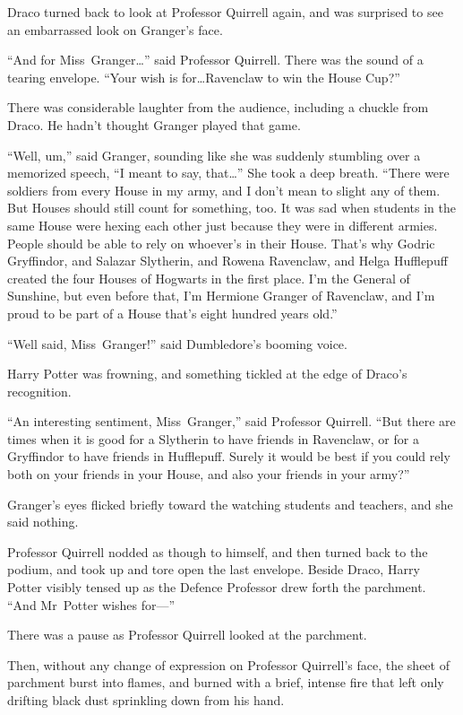 Draco turned back to look at Professor Quirrell again, and was surprised to see
an embarrassed look on Granger’s face.

“And for Miss~Granger…” said Professor Quirrell. There was the sound of
a tearing envelope. “Your wish is for…Ravenclaw to win the House Cup?”

There was considerable laughter from the audience, including a chuckle from
Draco. He hadn’t thought Granger played that game.

“Well, um,” said Granger, sounding like she was suddenly stumbling over a
memorized speech, “I meant to say, that…” She took a deep breath. “There
were soldiers from every House in my army, and I don’t mean to slight any of
them. But Houses should still count for something, too. It was sad when
students in the same House were hexing each other just because they were in
different armies. People should be able to rely on whoever’s in their House.
That’s why Godric Gryffindor, and Salazar Slytherin, and Rowena Ravenclaw, and
Helga Hufflepuff created the four Houses of Hogwarts in the first place. I’m
the General of Sunshine, but even before that, I’m Hermione Granger of
Ravenclaw, and I’m proud to be part of a House that’s eight hundred years old.”

“Well said, Miss~Granger!” said Dumbledore’s booming voice.

Harry Potter was frowning, and something tickled at the edge of Draco’s
recognition.

“An interesting sentiment, Miss~Granger,” said Professor Quirrell. “But there
are times when it is good for a Slytherin to have friends in Ravenclaw, or for
a Gryffindor to have friends in Hufflepuff. Surely it would be best if you
could rely both on your friends in your House, and also your friends in your
army?”

Granger’s eyes flicked briefly toward the watching students and teachers, and
she said nothing.

Professor Quirrell nodded as though to himself, and then turned back to the
podium, and took up and tore open the last envelope. Beside Draco, Harry Potter
visibly tensed up as the Defence Professor drew forth the parchment. “And
Mr~Potter wishes for—”

There was a pause as Professor Quirrell looked at the parchment.

Then, without any change of expression on Professor Quirrell’s face, the sheet
of parchment burst into flames, and burned with a brief, intense fire that left
only drifting black dust sprinkling down from his hand.

